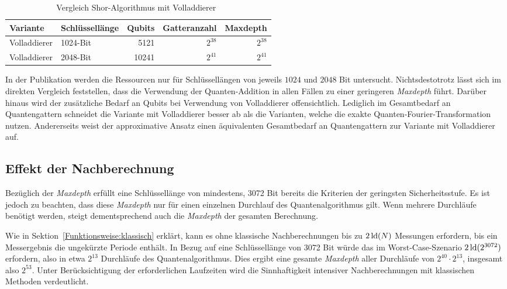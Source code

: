\begin{table}[H]
    \centering
    \begin{tabular}{llrrr}
        \hline
        \textbf{Variante} & \textbf{Schlüssellänge} & \textbf{Qubits} & \textbf{Gatteranzahl} & \textbf{Maxdepth} \\
        \hline
        Volladdierer & 1024-Bit & 5121 & \(2^{38}\) & \(2^{38}\) \\
        Volladdierer & 2048-Bit & 10241 & \(2^{41}\) & \(2^{41}\) \\
        \hline
    \end{tabular}
    \caption{Vergleich Shor-Algorithmus mit Volladdierer~\cite{cryptoeprint:2023/092}}
    \label{Volladdierer_Analyse}
\end{table}
In der Publikation werden die Ressourcen nur für Schlüssellängen von jeweils \(1024\) und \(2048\) Bit untersucht. 
Nichtsdestotrotz lässt sich im direkten Vergleich feststellen, 
dass die Verwendung der Quanten-Addition in allen Fällen zu einer geringeren \textit{Maxdepth} führt. 
Darüber hinaus wird der zusätzliche Bedarf an Qubits bei Verwendung von Volladdierer offensichtlich. 
Lediglich im Gesamtbedarf an Quantengattern schneidet die Variante mit Volladdierer besser ab als die Varianten, 
welche die exakte Quanten-Fourier-Transformation nutzen. 
Andererseits weist der approximative Ansatz einen äquivalenten Gesamtbedarf an Quantengattern zur Variante mit Volladdierer auf.

\subsection*{Effekt der Nachberechnung}

Bezüglich der \textit{Maxdepth} erfüllt eine Schlüssellänge von mindestens, 
3072 Bit bereits die Kriterien der geringsten Sicherheitsstufe. 
Es ist jedoch zu beachten, dass diese \textit{Maxdepth} nur für einen einzelnen Durchlauf des Quantenalgorithmus gilt. 
Wenn mehrere Durchläufe benötigt werden, steigt dementsprechend auch die \textit{Maxdepth} der gesamten Berechnung.

Wie in Sektion~\ref{Funktionsweise:klassisch} erklärt, kann es ohne klassische Nachberechnungen bis zu \(2\operatorname{ld}(N)\) Messungen erfordern, 
bis ein Messergebnis die ungekürzte Periode enthält. 
In Bezug auf eine Schlüssellänge von 3072 Bit würde das im Worst-Case-Szenario \(2\operatorname{ld}(2^{3072})\) erfordern, 
also in etwa \(2^{13}\) Durchläufe des Quantenalgorithmus.
Dies ergibt eine gesamte \textit{Maxdepth} aller Durchläufe von \(2^{40} \cdot 2^{13}\), insgesamt also \(2^{53}\).
Unter Berücksichtigung der erforderlichen Laufzeiten wird die Sinnhaftigkeit intensiver Nachberechnungen mit klassischen Methoden verdeutlicht.


